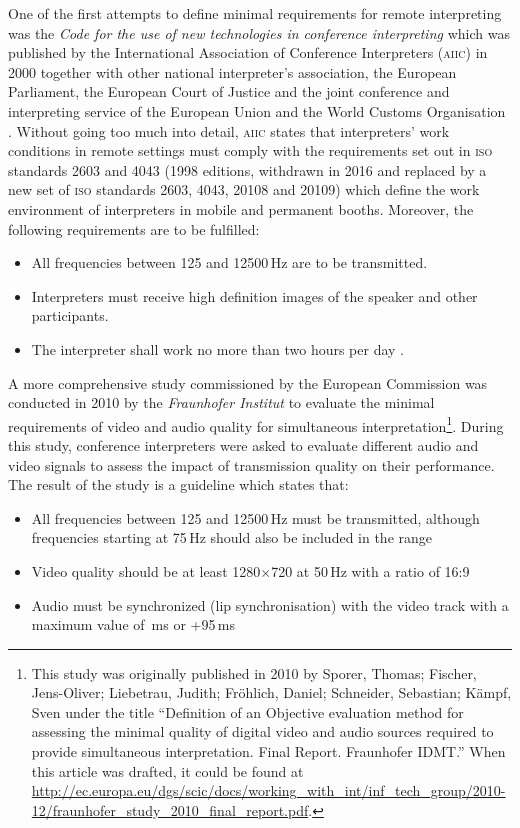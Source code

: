 \documentclass[output=paper]{langsci/langscibook}
\begin{document}
One of the first attempts to define minimal requirements for remote interpreting was the \textit{Code for the use of new technologies in conference interpreting} which was published by the International Association of Conference Interpreters (\textsc{aiic}) in 2000 together with other national interpreter’s association, the European Parliament, the European Court of Justice and the joint conference and interpreting service of the European Union and the World Customs Organisation \citep[31]{Korak2010}. Without going too much into detail, \textsc{aiic} states that interpreters’ work conditions in remote settings must comply with the requirements set out in \textsc{iso} standards 2603 and 4043 (1998 editions, withdrawn in 2016 and replaced by a new set of \textsc{iso} standards 2603, 4043, 20108 and 20109) which define the work environment of interpreters in mobile and permanent booths. Moreover, the following requirements are to be fulfilled:

\begin{itemize}
\item All frequencies between 125 and 12500\,Hz are to be transmitted.
\item Interpreters must receive high definition images of the speaker and other participants. 
\item The interpreter shall work no more than two hours per day \citep[2]{AIIC2000}.
\end{itemize}

A more comprehensive study commissioned by the European Commission was conducted in 2010 by the \textit{Fraunhofer Institut} to evaluate the minimal requirements of video and audio quality for simultaneous interpretation\footnote{This study was originally published in 2010 by Sporer, Thomas; Fischer, Jens-Oliver; Liebetrau, Judith; Fröhlich, Daniel; Schneider, Sebastian; Kämpf, Sven under the title “Definition of an Objective evaluation method for assessing the minimal quality of digital video and audio sources required to provide simultaneous interpretation. Final Report. Fraunhofer IDMT.” When this article was drafted, it could be found at \url{http://ec.europa.eu/dgs/scic/docs/working_with_int/inf_tech_group/2010-12/fraunhofer_study_2010_final_report.pdf}.}. During this study, conference interpreters were asked to evaluate different audio and video signals to assess the impact of transmission quality on their performance. The result of the study is a guideline which states that:

\begin{itemize}
\item All frequencies between 125 and 12500\,Hz must be transmitted, although frequencies starting at 75\,Hz should also be included in the range
\item Video quality should be at least 1280$\times$720 at 50\,Hz with a ratio of 16:9
\item Audio must be synchronized (lip synchronisation) with the video track with a maximum value of \,ms or +95\,ms
\end{itemize}
\end{document}
